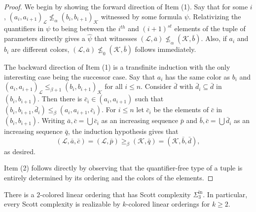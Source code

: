\documentclass[11pt]{amsart}
\newcommand{\mc}[1]{\mathcal{#1}}
\newcommand{\Sinf}[1]{\Sigma^{\mathrm{in}}_{#1}}
\theoremstyle{remark}
\begin{document}
\begin{proof}
We begin by showing the forward direction of Item (1).
Say that for some $i$, $(a_i,a_{i+1})_{\mc{L}}\not\leq_\alpha (b_i,b_{i+1})_{\mc{K}}$ witnessed by some formula $\psi$.
Relativizing the quantifiers in $\psi$ to being between the $i^{th}$ and $(i+1)^{st}$ elements of the tuple of parameters directly gives a $\hat{\psi}$ that witnesses $(\mc{L},\bar{a})\not\leq_{\alpha} (\mc{K},\bar{b})$.
Also, if $a_i$ and $b_i$ are different colors, $(\mc{L},\bar{a})\not\leq_0 (\mc{K},\bar{b})$ follows immediately.

The backward direction of Item (1) is a transfinite induction with the only interesting case being the successor case.
Say that $a_i$ has the same color as $b_i$ and $(a_i,a_{i+1})_{\mc{L}}\leq_{\beta+1} (b_i,b_{i+1})_{\mc{K}}$ for all $i\leq n$.
Consider $\bar d$ with $\bar d_i\subseteq \bar d$ in $(b_i,b_{i+1})$. Then there is $\bar c_i\in (a_i,a_{i+1})$ such that $(b_i,b_{i+1},\bar d_i)\leq_\beta ( a_i, a_{i+1},\bar c_i)$. 
For $i\leq n$ let $\bar{c}_i$ be the elements of $\bar{c}$ in $(b_i,b_{i+1})$.
Writing $\bar{a},\bar{c}=\bigcup \bar c_i$ as an increasing sequence $\bar{p}$ and $\bar{b},\bar{c}=\bigcup \bar d_i$ as an increasing sequence $\bar{q}$, the induction hypothesis gives that
\[(\mc{L},\bar{a},\bar{c})=(\mc{L},\bar{p})\geq_\beta(\mc{K},\bar{q})=(\mc{K},\bar{b},\bar{d}),\]
as desired.

Item (2) follows directly by observing that the quantifier-free type of a tuple is entirely determined by its ordering and the colors of the elements.
\end{proof}

\begin{theorem}\label{thm:allComplexities}
	There is a $2$-colored linear ordering that has Scott complexity $\Sinf{3}$.
    In particular, every Scott complexity is realizable by $k$-colored linear orderings for $k\geq 2$.
\end{theorem}
\end{document}
